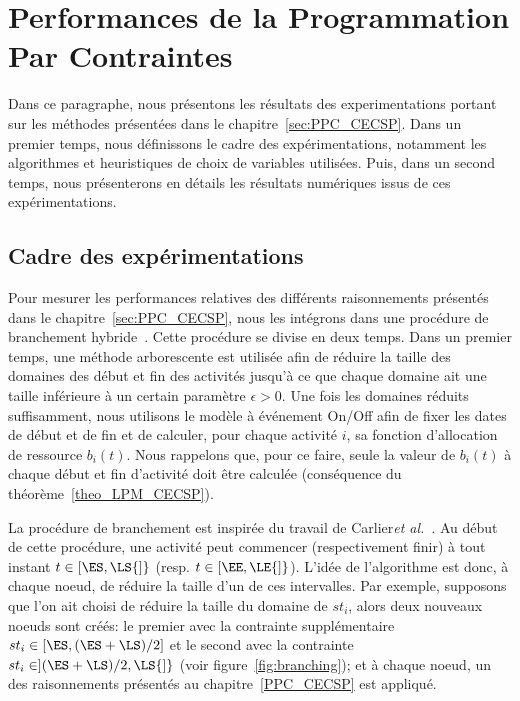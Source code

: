 \section{Performances de la Programmation Par Contraintes}

Dans ce paragraphe, nous présentons les résultats des experimentations
portant sur les méthodes présentées dans le
chapitre~\ref{sec:PPC_CECSP}. Dans un premier temps, nous définissons
le cadre des expérimentations, notamment les algorithmes et
heuristiques de choix de variables utilisées. Puis, dans un second
temps, nous présenterons en détails les résultats numériques issus de
ces expérimentations. 

\subsection{Cadre des expérimentations}

Pour mesurer les performances relatives des différents raisonnements
présentés dans le chapitre~\ref{sec:PPC_CECSP}, nous les intégrons
dans une procédure de branchement
hybride~\cite{Nattaf_Constraints,Nattaf_ORSpectrum}. Cette procédure
se divise en deux temps. Dans un premier temps, une méthode 
arborescente est utilisée afin de réduire la taille des domaines des
début et fin des activités jusqu'à ce que chaque domaine ait une
taille inférieure à un certain paramètre $\epsilon >0$. Une fois les
domaines réduits suffisamment, nous utilisons le modèle à événement
On/Off afin de fixer les dates de début et de fin et de calculer, pour
chaque activité $i$, sa fonction d'allocation de ressource
$b_i(t)$. Nous rappelons que, pour ce faire, seule la valeur de
$b_i(t)$ à chaque début et fin d'activité doit être calculée
(conséquence du théorème~\ref{theo_LPM_CECSP}).

La procédure de branchement est inspirée du travail de Carlier{\it et
  al.}~\cite{Carlier}. Au début de cette procédure, une activité peut
commencer (respectivement finir) à tout instant $t \in [\ES,\LS{]}$
(resp. $t \in [\EE,\LE{]}$). L'idée de l'algorithme est donc, à chaque
noeud, de réduire la taille d'un de ces intervalles. Par exemple,
supposons que l'on ait choisi de réduire la taille du domaine de
$st_i$, alors deux nouveaux noeuds sont créés: le premier avec la
contrainte supplémentaire $st_i \in [\ES , (\ES+\LS) / 2]$ et le
second avec la contrainte $st_i \in ](\ES+\LS) / 2,\LS{]}$ (voir
figure~\ref{fig:branching}); et à chaque noeud, un des raisonnements
présentés au chapitre~\ref{PPC_CECSP} est appliqué.

